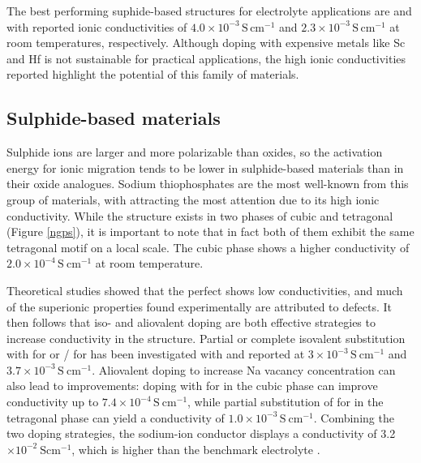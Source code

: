 \documentclass[12pt]{report}
\begin{document}
The best performing suphide-based structures for electrolyte applications are  and  with reported ionic conductivities of $4.0 \times 10^{-3} \, \mathrm{S \, cm^{-1}}$ and $2.3 \times 10^{-3} \, \mathrm{S \, cm^{-1}}$ at room temperatures, respectively.
Although doping with expensive metals like Sc and Hf is not sustainable for practical applications, the high ionic conductivities reported highlight the potential of this family of materials.\cite{ma2016, vogel1984}

\subsection{Sulphide-based materials}

Sulphide ions are larger and more polarizable than oxides, so the activation energy for ionic migration tends to be lower in sulphide-based materials than in their oxide analogues. \cite{cao2014}
Sodium thiophosphates are the most well-known from this group of materials, with  attracting the most attention due to its high ionic conductivity.
While the structure exists in two phases of cubic and tetragonal (Figure \ref{ngps}), it is important to note that in fact both of them exhibit the same tetragonal motif on a local scale.\cite{krauskopf2018}
The cubic phase shows a higher conductivity of $2.0 \times 10^{-4} \, \mathrm{S \ cm^{-1}}$ at room temperature.\cite{hayashi2012, famprikis2020}

Theoretical studies showed that the perfect  shows low conductivities, and much of the superionic properties found experimentally are attributed to defects.
It then follows that iso- and aliovalent doping are both effective strategies to increase conductivity in the  structure.
Partial or complete isovalent substitution with  for  or / for  has been investigated with  and  reported  at $3 \times 10^{-3} \, \mathrm{S \ cm^{-1}}$ and $3.7 \times 10^{-3} \, \mathrm{S \ cm^{-1}}$. \cite{wang2016, yu2017, zhang2015, banerjee2016, bo2016, zhang2016, wang2018}
Aliovalent doping to increase Na vacancy concentration can also lead to improvements: doping with  for  in the cubic phase can improve conductivity up to $7.4 \times 10^{-4} \, \mathrm{S \ cm^{-1}}$, while partial substitution of  for   in the tetragonal phase can yield a conductivity of $1.0 \times 10^{-3} \, \mathrm{S \ cm^{-1}}$.\cite{tanibata2014, chu2016,zhu2015}
Combining the two doping strategies, the sodium-ion conductor  displays a conductivity of 3.2 $\times 10^{-2} \ \mathrm{S cm^{-1}}$, which is higher than the benchmark electrolyte .\cite{hayashi2019}
\end{document}
